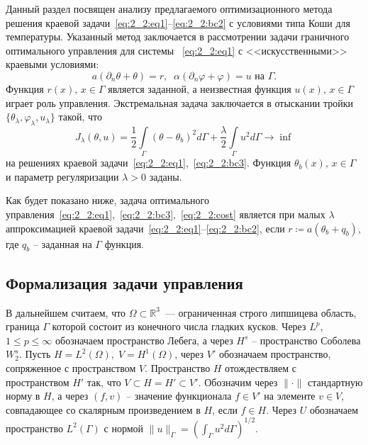 Данный раздел посвящен анализу предлагаемого
оптимизационного метода решения краевой задачи~\eqref{eq:2_2:eq1}--\eqref{eq:2_2:bc2}
с условиями типа Коши для температуры.
Указанный метод заключается в рассмотрении задачи
граничного оптимального управления для
системы ~\eqref{eq:2_2:eq1} с <<искусственными>> краевыми условиями:
\begin{equation}
    \label{eq:2_2:bc3}
    a(\partial_n\theta+\theta) = r,\;\;
    \alpha(\partial_n\varphi+\varphi) = u \text{ на }\Gamma.
\end{equation}
Функция $r(x),\, x\in\Gamma$ является заданной, а неизвестная функция $u(x),\, x\in\Gamma$
играет роль управления.
Экстремальная задача заключается в отыскании
тройки $\{\theta_\lambda,\varphi_\lambda,u_\lambda\}$
такой, что
\begin{equation}
    \label{eq:2_2:cost}
    J_\lambda(\theta, u) = \frac{1}{2}\int\limits_\Gamma (\theta - \theta_b)^2 d\Gamma
    + \frac{\lambda}{2}\int\limits_\Gamma u^2 d\Gamma \rightarrow\inf
\end{equation}
на решениях краевой задачи~\eqref{eq:2_2:eq1},~\eqref{eq:2_2:bc3}.
Функция $\theta_b(x),\, x\in\Gamma$  и параметр регуляризации $\lambda>0$ заданы.

Как будет показано ниже, задача оптимального \\
управления~\eqref{eq:2_2:eq1},~\eqref{eq:2_2:bc3},~\eqref{eq:2_2:cost}
является при малых $\lambda$ аппроксимацией краевой
задачи~\eqref{eq:2_2:eq1}--\eqref{eq:2_2:bc2},
если $r \coloneqq a(\theta_b+q_b)$, где $q_b$ -- заданная на $\Gamma$ функция.


\subsection{Формализация задачи управления}\label{subsec:ch2/sec2/subsec2}
В дальнейшем считаем, что $\Omega\subset \mathbb{R}^3$~--- ограниченная строго липшицева
область, граница $\Gamma$ которой состоит из конечного числа
гладких кусков.
Через $L^p$, $1 \leq p \leq \infty$ обозначаем
пространство Лебега, а через $H^s$ -- пространство Соболева $W^s_2$.
Пусть $H = L^2(\Omega), \; V = H^1(\Omega)$, через $V'$ обозначаем
пространство, сопряженное с пространством $V$.
Пространство $H$ отождествляем с пространством $H'$ так, что $V \subset H = H' \subset V'$.
Обозначим через $\|\cdot\|$ стандартную норму в $H$, а через
$(f,v)$ -- значение функционала $f\in V'$ на элементе $v\in V$,
совпадающее со скалярным произведением в $H$, если $f\in H$.
Через $U$ обозначаем пространство $L^2(\Gamma)$ с нормой
$\|u\|_\Gamma=\left(\int_\Gamma u^2 d\Gamma\right)^{1/2}$.



